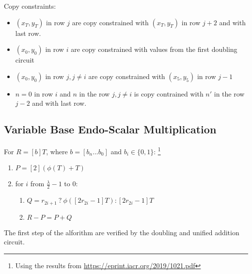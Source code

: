     Copy constraints:
    \begin{itemize}
    \item $(x_T,y_T)$ in row $j$ are copy constrained with $(x_T,y_T)$ in row $j + 2$ and with last row.
    \item $(x_0,y_0)$ in row $i$ are copy constrained with values from the first doubling circuit
    \item $(x_0,y_0)$ in row $j, j \neq i$ are copy constrained with $(x_5,y_5)$ in row $j - 1$ 
    \item $n = 0$ in row $i$ and $n$ in the row $j, j \neq i$ is copy contrained with $n'$ in the row $j-2$ and with last row.
    \end{itemize}

\subsection{Variable Base Endo-Scalar Multiplication}

For $R  = [b]T$, where $b = [b_n ... b_0]$ and $b_i \in \{0, 1\}$:
 \footnote{Using the results from \url{https://eprint.iacr.org/2019/1021.pdf}}
\begin{enumerate}
    \item $P = [2](\phi(T) + T)$
    \item for $i$ from $\frac{\lambda}{2} - 1$ to $0$:
    \begin{enumerate}
        \item $Q = r_{2i + 1} \: ? \: \phi([2r_{2i} - 1]T) : [2r_{2i} - 1]T$
        \item $R - P = P + Q$
    \end{enumerate}
\end{enumerate}
The first step of the alforithm are verified by the doubling and unified addition circuit. 

